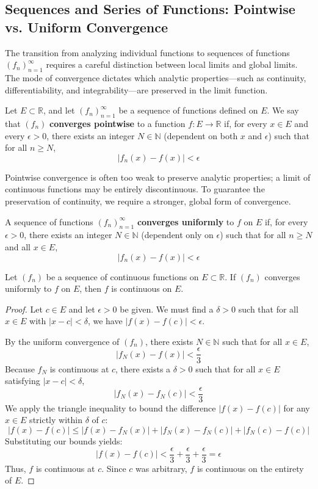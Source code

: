 \subsection{Sequences and Series of Functions: Pointwise vs. Uniform Convergence}

The transition from analyzing individual functions to sequences of functions $(f_n)_{n=1}^\infty$ requires a careful distinction between local limits and global limits. The mode of convergence dictates which analytic properties—such as continuity, differentiability, and integrability—are preserved in the limit function.

\begin{definition}
Let $E \subset \mathbb{R}$, and let $(f_n)_{n=1}^\infty$ be a sequence of functions defined on $E$. We say that $(f_n)$ \textbf{converges pointwise} to a function $f: E \to \mathbb{R}$ if, for every $x \in E$ and every $\epsilon > 0$, there exists an integer $N \in \mathbb{N}$ (dependent on both $x$ and $\epsilon$) such that for all $n \ge N$,
\[
|f_n(x) - f(x)| < \epsilon
\]
\end{definition}

Pointwise convergence is often too weak to preserve analytic properties; a limit of continuous functions may be entirely discontinuous. To guarantee the preservation of continuity, we require a stronger, global form of convergence.

\begin{definition}
A sequence of functions $(f_n)_{n=1}^\infty$ \textbf{converges uniformly} to $f$ on $E$ if, for every $\epsilon > 0$, there exists an integer $N \in \mathbb{N}$ (dependent only on $\epsilon$) such that for all $n \ge N$ and all $x \in E$,
\[
|f_n(x) - f(x)| < \epsilon
\]
\end{definition}

\begin{theorem}
Let $(f_n)$ be a sequence of continuous functions on $E \subset \mathbb{R}$. If $(f_n)$ converges uniformly to $f$ on $E$, then $f$ is continuous on $E$.
\end{theorem}

\begin{proof}
Let $c \in E$ and let $\epsilon > 0$ be given. We must find a $\delta > 0$ such that for all $x \in E$ with $|x - c| < \delta$, we have $|f(x) - f(c)| < \epsilon$.

By the uniform convergence of $(f_n)$, there exists $N \in \mathbb{N}$ such that for all $x \in E$,
\[
|f_N(x) - f(x)| < \frac{\epsilon}{3}
\]
Because $f_N$ is continuous at $c$, there exists a $\delta > 0$ such that for all $x \in E$ satisfying $|x - c| < \delta$,
\[
|f_N(x) - f_N(c)| < \frac{\epsilon}{3}
\]
We apply the triangle inequality to bound the difference $|f(x) - f(c)|$ for any $x \in E$ strictly within $\delta$ of $c$:
\[
|f(x) - f(c)| \le |f(x) - f_N(x)| + |f_N(x) - f_N(c)| + |f_N(c) - f(c)|
\]
Substituting our bounds yields:
\[
|f(x) - f(c)| < \frac{\epsilon}{3} + \frac{\epsilon}{3} + \frac{\epsilon}{3} = \epsilon
\]
Thus, $f$ is continuous at $c$. Since $c$ was arbitrary, $f$ is continuous on the entirety of $E$.
\end{proof}

